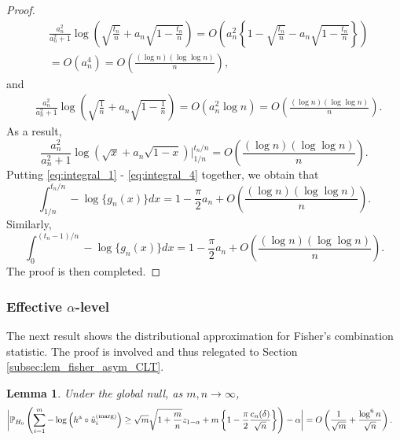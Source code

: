 \documentclass[11pt]{article}
\newtheorem{lemma}{Lemma}
\def\marg{\textnormal{(marg)}}
\def\asym{\textnormal{a}}
\renewcommand{\P}{\mathbb{P}}
\newcommand{\lb}{\left(}
\newcommand{\rb}{\right)}
\begin{document}
\begin{proof}
\begin{align*}
    &\frac{a_n^2}{a_n^2 + 1}\log\lb \sqrt{\frac{t_n}{n}} + a_n\sqrt{1 - \frac{t_n}{n}}\rb = O\lb a_n^2\left\{1 - \sqrt{\frac{t_n}{n}} - a_n\sqrt{1 - \frac{t_n}{n}}\right\}\rb\\
    &= O(a_n^4) = O\lb\frac{(\log n)(\log\log n)}{n}\rb,
  \end{align*}
  and
  \begin{align*}
    &\frac{a_n^2}{a_n^2 + 1}\log\lb \sqrt{\frac{1}{n}} + a_n\sqrt{1 - \frac{1}{n}}\rb = O(a_n^2 \log n) = O\lb\frac{(\log n)(\log\log n)}{n}\rb.
  \end{align*}
  As a result,
  \begin{equation}
    \label{eq:integral_4}
    \frac{a_n^2}{a_n^2 + 1}\log\lb \sqrt{x} + a_n\sqrt{1 - x}\rb\bigg|_{1/n}^{t_n/n} = O\lb\frac{(\log n)(\log\log n)}{n}\rb.
  \end{equation}
  Putting \eqref{eq:integral_1} - \eqref{eq:integral_4} together, we obtain that
  \[\int_{1/n}^{t_n / n}-\log \{g_n(x)\}dx = 1 - \frac{\pi}{2}a_n + O\lb\frac{(\log n)(\log \log n)}{n}\rb.\]
  Similarly,
  \[\int_{0}^{(t_n - 1) / n}-\log \{g_n(x)\}dx = 1 - \frac{\pi}{2}a_n + O\lb\frac{(\log n)(\log \log n)}{n}\rb.\]
  The proof is then completed.
\end{proof}

\subsubsection{Effective $\alpha$-level}
The next result shows the distributional approximation for Fisher's combination statistic. The proof is involved and thus relegated to Section \ref{subsec:lem_fisher_asym_CLT}.
\begin{lemma}\label{lem:fisher_asym_CLT}
  Under the global null, as $m, n\rightarrow \infty$,
  \begin{align*}
    &\bigg|\P_{H_0}\lb \sum_{i=1}^{m}-\log\lb h^{\asym}\circ \hat{u}^\marg_i\rb\ge \sqrt{m}\sqrt{1 + \frac{m}{n}}z_{1- \alpha} + m \left\{ 1 - \frac{\pi}{2}\frac{c_n(\delta)}{\sqrt{n}}\right\}\rb - \alpha\bigg|
     = O\lb \frac{1}{\sqrt{m}} + \frac{\log^6 n}{\sqrt{n}}\rb.
  \end{align*}
\end{lemma}
\end{document}
